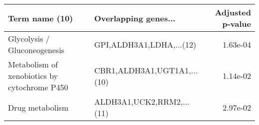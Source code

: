 \begin{tabular}{llr}
\toprule
                              Term name (10) &        Overlapping genes... &  Adjusted p-value \\
\midrule
                Glycolysis / Gluconeogenesis &    GPI,ALDH3A1,LDHA,...(12) &          1.63e-04 \\
Metabolism of xenobiotics by cytochrome P450 & CBR1,ALDH3A1,UGT1A1,...(10) &          1.14e-02 \\
                             Drug metabolism &   ALDH3A1,UCK2,RRM2,...(11) &          2.97e-02 \\
\bottomrule
\end{tabular}
